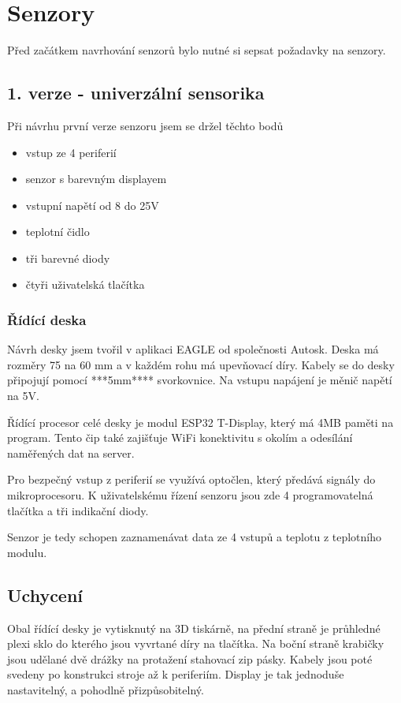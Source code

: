 \chapter{Senzory}

Před začátkem navrhování senzorů bylo nutné si sepsat požadavky na senzory.




\section{1. verze - univerzální sensorika}

Při návrhu první verze senzoru jsem se držel těchto bodů
\begin{itemize}
    \item vstup ze 4 periferií
    \item senzor s barevným displayem
    \item vstupní napětí od 8 do 25V
    \item teplotní čidlo
    \item tři barevné diody
    \item čtyři uživatelská tlačítka
\end{itemize}


\subsection{Řídící deska}
Návrh desky jsem tvořil v aplikaci EAGLE od společnosti Autosk. 
Deska má rozměry 75 na 60 mm a v každém rohu má upevňovací díry. 
Kabely se do desky připojují pomocí ***5mm**** svorkovnice.
Na vstupu napájení je měnič napětí na 5V. 

Řídící procesor celé desky je modul ESP32 T-Display, který má 4MB paměti na program.
Tento čip také zajišťuje WiFi konektivitu s okolím a odesílání naměřených dat na server.

Pro bezpečný vstup z periferií se využívá optočlen, který předává signály do mikroprocesoru.
\fxnote[author=JA]{\textcolor{mygreen}{Optočlen}}
K uživatelskému řízení senzoru jsou zde 4 programovatelná tlačítka a tři indikační diody.

Senzor je tedy schopen zaznamenávat data ze 4 vstupů a teplotu z teplotního modulu.

\section{Uchycení}
Obal řídící desky je vytisknutý na 3D tiskárně, na přední straně je průhledné plexi sklo do kterého jsou vyvrtané díry na tlačítka.
Na boční straně krabičky jsou udělané dvě drážky na protažení stahovací zip pásky. Kabely jsou poté svedeny po konstrukci stroje až k periferiím.
Display je tak jednoduše nastavitelný, a pohodlně přizpůsobitelný.


